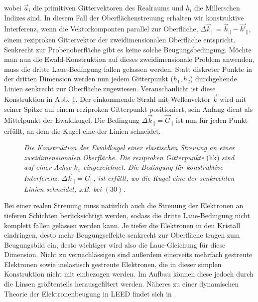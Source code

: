wobei $\vec{a}_i$ die primitiven Gittervektoren des Realraums und $h_i$ die Millerschen Indizes
sind. In diesem Fall der Oberflächenstreuung erhalten wir konstruktive Interferenz,
wenn die Vektorkomponten parallel zur Oberfläche, $\Delta\vec{k}_{||}=\vec{k}_{||}-\vec{k'}_{||}$,
einem reziproken Gittervektor der zweidimensionalen Oberfläche entspricht. Senkrecht zur Probenoberfläche
gibt es keine solche Beugungsbedingung. Möchte man nun die Ewald-Konstruktion auf dieses
zweidimensionale Problem anwenden, muss die dritte Laue-Bedingung fallen gelassen werden. Statt
diskreter Punkte in der dritten Dimension werden nun jedem Gitterpunkt ($h_1, h_2$) durchgehende
Linien senkrecht zur Oberfläche zugewiesen. Veranschaulicht ist diese Konstruktion in Abb.
\ref{ewald}. Der einkommende Strahl mit Wellenvektor $\vec{k}$ wird mit seiner Spitze auf einem
reziproken Gitterpunkt positioniert, sein Anfang dient als Mittelpunkt der Ewaldkugel. Die
Bedingung $\Delta \vec{k}_{||}=\vec{G}_{||}$ ist nun für jeden Punkt erfüllt, an dem die Kugel eine
der Linien schneidet. 
\begin{figure}[H]
\centering
\sffamily 

\caption{\textit{Die Konstruktion der Ewaldkugel einer elastischen Streuung an einer
zweidimensionalen Oberfläche. Die reziproken Gitterpunkte} (hk) \textit{sind auf einer Achse $k_x$
eingezeichnet. Die Bedingung für konstruktive Interferenz, $\Delta \vec{k}_{||}=\vec{G}_{||}$,  ist erfüllt, wo die Kugel eine der senkrechten Linien
schneidet, z.B. bei $(30)$. }}
\label{ewald}
\end{figure}




Bei einer realen Streuung muss natürlich auch die Streuung der Elektronen an tieferen
Schichten berücksichtigt werden, sodass die dritte Laue-Bedingung nicht komplett fallen gelassen werden
kann. Je tiefer die Elektronen in den Kristall eindringen, desto mehr Beugungseffekte senkrecht zur
Oberfläche tragen zum Beugungsbild ein, desto wichtiger wird also die Laue-Gleichung für diese
Dimension. Nicht zu vernachlässigen sind außerdem einerseits mehrfach gestreute Elektronen sowie
inelastisch gestreute Elektronen, die in dieser simplen Konstruktion nicht mit einbezogen werden. Im
Aufbau können diese jedoch durch die Linsen größtenteils herausgefiltert werden. Näheres zu einer dynamischen
Theorie der Elektronenbeugung in LEED findet sich in \cite{Lueth}.

\FloatBarrier










